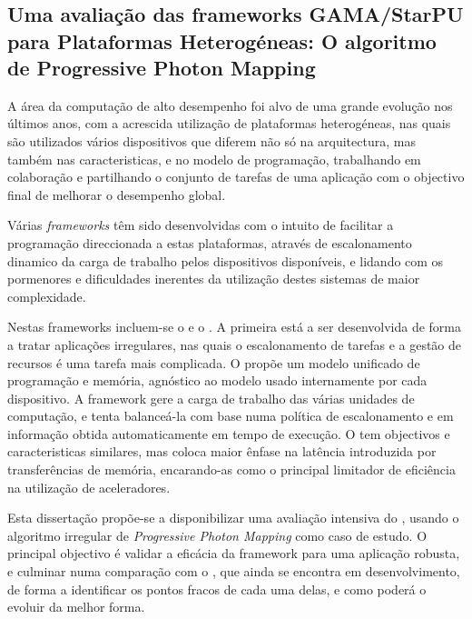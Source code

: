 \documentclass[main.tex]{subfiles}
\begin{document}
\cleardoublepage
{}
{}
\chapter*{\abstractname}
  \section*{Uma avaliação das frameworks GAMA/StarPU para Plataformas Heterogéneas: O algoritmo de Progressive Photon Mapping}

  A área da computação de alto desempenho foi alvo de uma grande evolução nos últimos anos, com a acrescida utilização de plataformas heterogéneas, nas quais são utilizados vários dispositivos que diferem não só na arquitectura, mas também nas caracteristicas, e no modelo de programação, trabalhando em colaboração e partilhando o conjunto de tarefas de uma aplicação com o objectivo final de melhorar o desempenho global.

  Várias \textit{frameworks} têm sido desenvolvidas com o intuito de facilitar a programação direccionada a estas plataformas, através de escalonamento dinamico da carga de trabalho pelos dispositivos disponíveis, e lidando com os pormenores e dificuldades inerentes da utilização destes sistemas de maior complexidade.

  Nestas frameworks incluem-se o \gama e o \starpu. A primeira está a ser desenvolvida de forma a tratar aplicações irregulares, nas quais o escalonamento de tarefas e a gestão de recursos é uma tarefa mais complicada. O \gama propõe um modelo unificado de programação e memória, agnóstico ao modelo usado internamente por cada dispositivo. A framework gere a carga de trabalho das várias unidades de computação, e tenta balanceá-la com base numa política de escalonamento e em informação obtida automaticamente em tempo de execução. O \starpu tem objectivos e caracteristicas similares, mas coloca maior ênfase na latência introduzida por transferências de memória, encarando-as como o principal limitador de eficiência na utilização de aceleradores.

  Esta dissertação propõe-se a disponibilizar uma avaliação intensiva do \starpu, usando o algoritmo irregular de \textit{Progressive Photon Mapping} como caso de estudo. O principal objectivo é validar a eficácia da framework para uma aplicação robusta, e culminar numa comparação com o \gama, que ainda se encontra em desenvolvimento, de forma a identificar os pontos fracos de cada uma delas, e como poderá o \gama evoluir da melhor forma.
\end{document}
